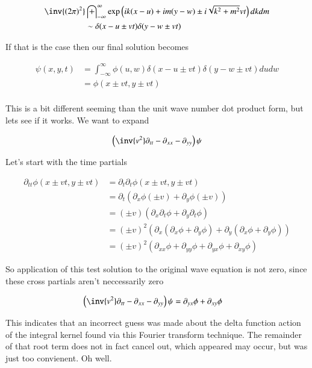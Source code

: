 \documentclass{article}
\newcommand{\IIinf}[0]{ \int_{-\infty}^\infty }
\begin{document}
\begin{align*}
\inv{({2\pi})^2} &\IIinf \exp\left( i k (x-u) + i m (y-w) \pm i \sqrt{k^2 + m^2} v t \right) dk dm \\
&\sim 
\delta( x -u \pm vt )
\delta( y -w \pm vt )
\end{align*}

If that is the case then our final solution becomes

\begin{align*}
\psi(x,y,t) 
&= \IIinf \phi(u,w) \delta( x -u \pm vt ) \delta( y -w \pm vt ) du dw \\
&= \phi( x \pm vt, y \pm vt ) \\
\end{align*}

This is a bit different seeming than the unit wave number dot product form, but lets see if it works.  We want to expand

\begin{align*}
\left(\inv{v^2} \partial_{tt} -\partial_{xx} -\partial_{yy} \right)\psi
\end{align*}

Let's start with the time partials

\begin{align*}
\partial_{tt} \phi( x \pm vt, y \pm vt ) 
&=
\partial_{t} \partial_t \phi( x \pm vt, y \pm vt ) \\
&= \partial_{t} ( \partial_x \phi (\pm v) +\partial_y \phi (\pm v) ) \\
&= (\pm v)( \partial_{x} \partial_t \phi  + \partial_y \partial_t \phi ) \\
&= (\pm v)^2( \partial_{x} (\partial_x \phi + \partial_y \phi)  + \partial_y (\partial_x \phi + \partial_y \phi)) \\
&= (\pm v)^2( \partial_{xx} \phi +\partial_{yy} \phi +\partial_{yx} \phi +\partial_{xy} \phi )
\end{align*}

So application of this test solution to the original wave equation is not zero, since these cross partials aren't neccessarily zero

\begin{align*}
\left(\inv{v^2} \partial_{tt} -\partial_{xx} -\partial_{yy} \right)\psi 
&= \partial_{yx} \phi + \partial_{xy} \phi 
\end{align*}

This indicates that an incorrect guess was made about the delta function action of the integral kernel found 
via this Fourier transform technique.  The remainder of that root term does not in fact cancel out, which appeared may 
occur, but was just too convienent.  Oh well.
\end{document}
